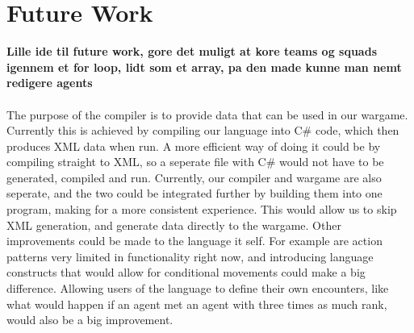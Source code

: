 \chapter{Future Work}
\textbf{Lille ide til future work, gore det muligt at kore teams og squads igennem et for loop, lidt som et array, pa den made kunne man nemt redigere agents}\\ \\
The purpose of the compiler is to provide data that can be used in our wargame. 
Currently this is achieved by compiling our language into C\# code, which then produces XML data when run. 
A more efficient way of doing it could be by compiling straight to XML, so a seperate file with C\# would not have to be generated, compiled and run.\newline
Currently, our compiler and wargame are also seperate, and the two could be integrated further by building them into one program, making for a more consistent experience. 
This would allow us to skip XML generation, and generate data directly to the wargame.\newline
Other improvements could be made to the language it self. 
For example are action patterns very limited in functionality right now, and introducing language constructs that would allow for conditional movements could make a big difference. 
Allowing users of the language to define their own encounters, like what would happen if an agent met an agent with three times as much rank, would also be a big improvement.